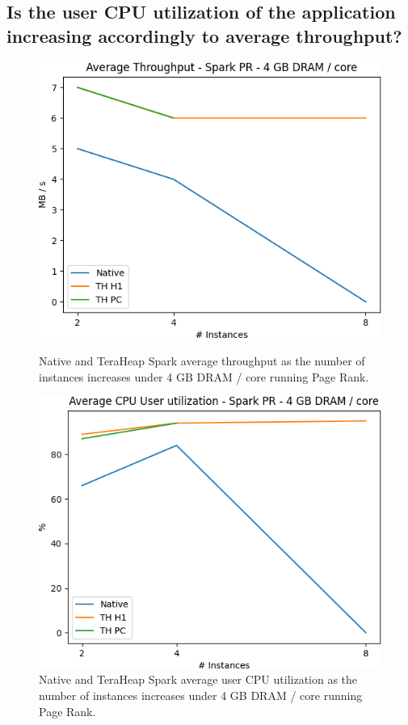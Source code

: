 \subsection{Is the user CPU utilization of the application increasing
accordingly to average throughput?}
\begin{figure}[thbp]
	\centering
        \includegraphics[width=\linewidth]{./fig/PR_64_THR.png}
    \caption{Native and TeraHeap Spark average throughput
	as the number of instances increases under 4 GB DRAM / core running Page Rank.}
\label{fig:pr_64_thr}
        \includegraphics[width=\linewidth]{./fig/PR_64_USR.png}
    \caption{Native and TeraHeap Spark average user CPU utilization
        as the number of instances increases under 4 GB DRAM / core running Page Rank.}
                \label{fig:pr_64_usr}
\end{figure}


